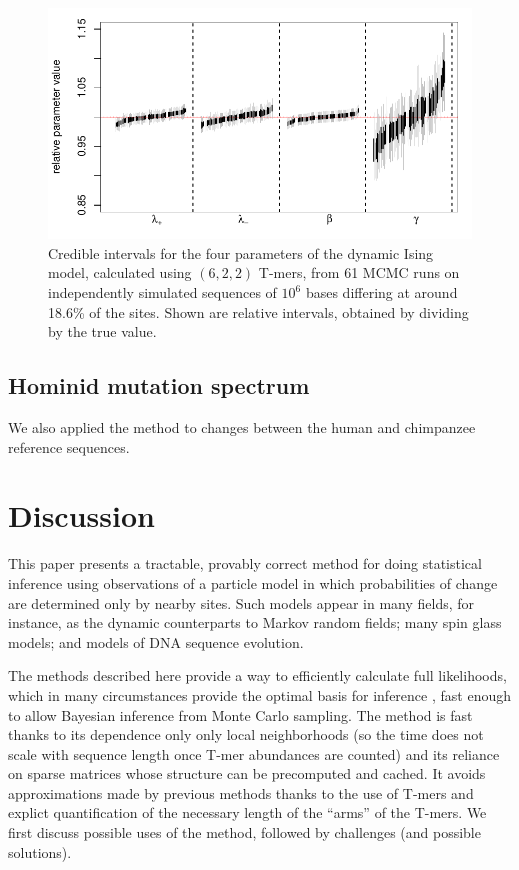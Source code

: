 \documentclass{article}
\theoremstyle{plain}
\theoremstyle{definition}
\begin{document}
\begin{figure}
    \begin{center} 
        \includegraphics{writeup-plots/coverage_results}
    \end{center} 
    \caption{
        Credible intervals for the four parameters of the dynamic Ising model,
        calculated using $(6,2,2)$ T-mers,
        from 61 MCMC runs on independently simulated sequences of $10^6$ bases
        differing at around 18.6\% of the sites.
        Shown are relative intervals, obtained by dividing by the true value.
        \label{fig:ising_coverage}}
\end{figure}


\subsection{Hominid mutation spectrum}

We also applied the method to changes between the human and chimpanzee reference sequences.



\section{Discussion}

This paper presents a tractable, provably correct method
for doing statistical inference using observations of a particle model
in which probabilities of change are determined only by nearby sites.
Such models appear in many fields, for instance,
as the dynamic counterparts to Markov random fields;
many spin glass models;
and models of DNA sequence evolution.

The methods described here provide a way to efficiently calculate full likelihoods,
which in many circumstances provide the optimal basis for inference \citep{neymanpearson},
fast enough to allow Bayesian inference from Monte Carlo sampling.
The method is fast thanks to its dependence only only local neighborhoods
(so the time does not scale with sequence length once T-mer abundances are counted)
and its reliance on sparse matrices whose structure can be precomputed and cached.
It avoids approximations made by previous methods thanks to the use of T-mers
and explict quantification of the necessary length of the ``arms'' of the T-mers.
We first discuss possible uses of the method,
followed by challenges (and possible solutions).
\end{document}
